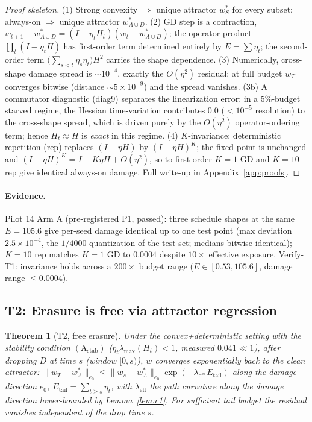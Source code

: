 \documentclass{article}
\newtheorem{theorem}{Theorem}
\newcommand{\Expo}{E}         %
\newcommand{\lam}{\lambda}
\newcommand{\lameff}{\lam_{\mathrm{eff}}}
\begin{document}
\begin{proof}[Proof skeleton]
(1) Strong convexity $\Rightarrow$ unique attractor $w^*_S$ for every subset; always-on $\Rightarrow$
unique attractor $w^*_{A\cup D}$. (2) GD step is a contraction,
$w_{t+1}-w^*_{A\cup D}=(I-\eta_t H_t)(w_t-w^*_{A\cup D})$; the operator product
$\prod_t(I-\eta_t H)$ has first-order term determined entirely by $\Expo=\sum\eta_t$; the
second-order term $\big(\sum_{s<t}\eta_s\eta_t\big)H^2$ carries the shape dependence.
(3) Numerically, cross-shape damage spread is $\sim10^{-4}$, exactly the $O(\eta^2)$ residual;
at full budget $w_T$ converges bitwise (distance $\sim5\times10^{-9}$) and the spread vanishes.
(3b) A commutator diagnostic (diag9) separates the linearization error: in a 5\%-budget starved
regime, the Hessian time-variation contributes $0.0$ ($<10^{-5}$ resolution) to the cross-shape
spread, which is driven purely by the $O(\eta^2)$ operator-ordering term; hence $H_t\approx H$ is
\emph{exact} in this regime. (4) $K$-invariance: deterministic repetition (rep) replaces
$(I-\eta H)$ by $(I-\eta H)^K$; the fixed point is unchanged and $(I-\eta H)^K=I-K\eta H+O(\eta^2)$,
so to first order $K=1$ GD and $K=10$ rep give identical always-on damage. Full write-up in
Appendix~\ref{app:proofs}.
\end{proof}

\paragraph{Evidence.} Pilot 14 Arm A (pre-registered P1, passed): three schedule shapes at the
same $\Expo=105.6$ give per-seed damage identical up to one test point (max deviation
$2.5\times10^{-4}$, the $1/4000$ quantization of the test set; medians bitwise-identical);
$K=10$ rep matches $K=1$ GD to
$0.0004$ despite $10\times$ effective exposure. Verify-T1: invariance holds across a $200\times$
budget range ($\Expo\in[0.53,105.6]$, damage range $\le0.0004$).

\subsection{T2: Erasure is free via attractor regression}
\label{sec:t2}

\begin{theorem}[T2, free erasure]
\label{thm:t2}
Under the convex+deterministic setting with the stability condition $(\mathrm{A}_{\mathrm{stab}})$
($\eta_t\lambda_{\max}(H_t)<1$, measured $0.041\ll1$), after dropping $D$ at time $s$
(window $[0,s)$), $w$
converges exponentially back to the clean attractor:
$\|w_T-w^*_A\|_{e_0}\le\|w_s-w^*_A\|_{e_0}\exp(-\lameff\,E_{\mathrm{tail}})$ along the damage direction $e_0$,
$E_{\mathrm{tail}}=\sum_{t\ge s}\eta_t$, with $\lameff$ the path curvature along the damage
direction lower-bounded by Lemma~\ref{lem:c1}. For sufficient tail budget the residual vanishes
\emph{independent of the drop time $s$}.
\end{theorem}
\end{document}
